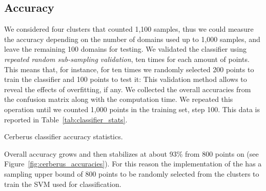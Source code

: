 \subsection{Accuracy} %
\label{sub:accuracy}
We considered four clusters that counted 1,100 samples, thus we could
measure the accuracy depending on the number of domains used up to 1,000 samples, and
leave the remaining 100 domains for testing. We validated the classifier using
\emph{repeated random sub-sampling validation}, ten times for each amount of points.
This means that, for instance, for ten times we randomly selected 200 points to train
the classifier and 100 points to test it: This validation method allows to reveal the effects of overfitting, if any.  We collected the overall accuracies from
the confusion matrix along with the computation time. We repeated this operation
until we counted 1,000 points in the training set, step 100. This data is reported in
Table~\ref{tab:classifier_stats}.
\begin{table}[!htp]
\centering
{}
\caption{Cerberus classifier accuracy statistics.}
\label{tab:classifier_stats}
\end{table}
Overall accuracy grows and then stabilizes at about 93\% from 800 points on
(see Figure~\ref{fig:cerberus_accuracies}). For this reason the implementation
of the  has a sampling upper bound of 800 points to be randomly selected
from the clusters to train the SVM used for classification.
